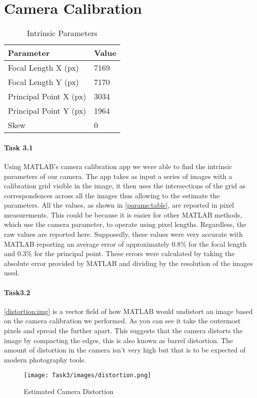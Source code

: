 \section{Camera Calibration}

\begin{table}[]
   \centering
   \begin{tabular}{l|l}
   Parameter             & Value \\ \hline
   Focal Length X (px)   & 7169  \\ \hline
   Focal Length Y (px)   & 7170  \\ \hline
   Principal Point X (px) & 3034  \\ \hline
   Principal Point Y (px) & 1964  \\ \hline
   Skew                  & 0    
   \end{tabular}
   \caption{Intrinsic Parameters}
   \label{params:table}
\end{table}

\paragraph{Task 3.1} Using MATLAB's camera calibration app we were able to find the intrinsic parameters of our camera. The app takes as input a series of images with a calibration grid visible in the image, it then uses the intersections of the grid as correspondences across all the images thus allowing to the estimate the parameters. All the values, as shown in \autoref{params:table}, are reported in pixel measurements. This could be because it is easier for other MATLAB methods, which use the camera parameter, to operate using pixel lengths. Regardless, the raw values are reported here. Supposedly, these values were very accurate with MATLAB reporting an average error of approximately 0.8\% for the focal length and 0.3\% for the principal point. These errors were calculated by taking the absolute error provided by MATLAB and dividing by the resolution of the images used.

\paragraph{Task3.2} \autoref{distortion:img} is a vector field of how MATLAB would undistort an image based on the camera calibration we performed. As you can see it take the outermost pixels and spread the further apart. This suggests that the camera distorts the image by compacting the edges, this is also known as barrel distortion. The amount of distortion in the camera isn't very high but that is to be expected of modern photography tools.

\begin{figure}[ht]
   \centering
   \texttt{[image: Task3/images/distortion.png]}
   \caption{Estimated Camera Distortion}
   \label{distortion:img}
\end{figure}
